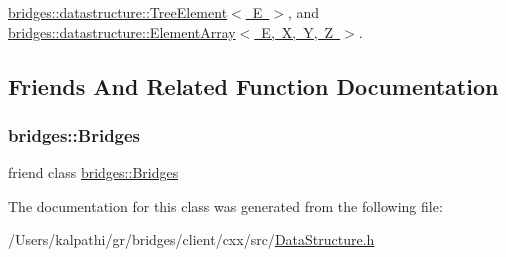 \mbox{\hyperlink{classbridges_1_1datastructure_1_1_tree_element_a897f34ea284da45e1dc869c3e3b6c9a4}{bridges\+::datastructure\+::\+Tree\+Element$<$ E $>$}}, and \mbox{\hyperlink{classbridges_1_1datastructure_1_1_element_array_a22d8c37e88616105cdb7c755f99fdb20}{bridges\+::datastructure\+::\+Element\+Array$<$ E, X, Y, Z $>$}}.



\subsection{Friends And Related Function Documentation}
\mbox{\label{classbridges_1_1datastructure_1_1_data_structure_a5c4164a6c5cd1eab3f12871efc2dbe26}} 
\subsubsection{\texorpdfstring{bridges\+::\+Bridges}{bridges::Bridges}}
{\footnotesize\ttfamily friend class \mbox{\hyperlink{classbridges_1_1_bridges}{bridges\+::\+Bridges}}\hspace{0.3cm}{\ttfamily [friend]}}



The documentation for this class was generated from the following file\+:\begin{DoxyCompactItemize}
\item 
/\+Users/kalpathi/gr/bridges/client/cxx/src/\mbox{\hyperlink{_data_structure_8h}{Data\+Structure.\+h}}\end{DoxyCompactItemize}
